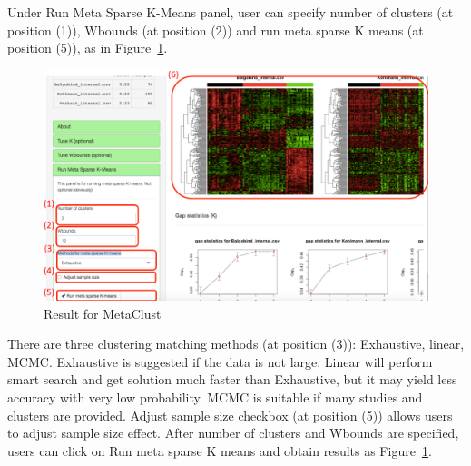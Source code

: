 \begin{steps}
Under Run Meta Sparse K-Means panel,
user can specify number of clusters (at position {\color{red} (1)}), Wbounds (at position {\color{red} (2)}) and run meta sparse K means (at position {\color{red} (5)}), 
as in Figure~\ref{fig:mskmRes}.
\begin{figure}[H]
\begin{center}
\includegraphics[scale=0.4]{./figure/metaClust/mskmRes}
\caption{Result for MetaClust}
\label{fig:mskmRes}
\end{center}
\end{figure}
There are three clustering matching methods (at position {\color{red} (3)}): Exhaustive, linear, MCMC.
Exhaustive is suggested if the data is not large.
Linear will perform smart search and get solution much faster than Exhaustive, 
but it may yield less accuracy with very low probability.
MCMC is suitable if many studies and clusters are provided.
Adjust sample size checkbox (at position {\color{red} (5)}) allows users to adjust sample size effect.
After number of clusters and Wbounds are specified,
users can click on Run meta sparse K means and obtain results as Figure~\ref{fig:mskmRes}.

\end{steps}

